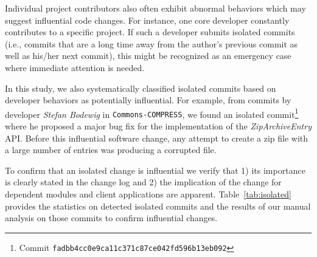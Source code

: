 
Individual project contributors also often exhibit abnormal
behaviors which may suggest influential code changes.
For instance, one core developer constantly contributes
 to a specific project. If such a developer
submits isolated commits (i.e., commits that are a long time away from
the author's previous commit as well as his/her next commit), this
might be recognized as an emergency case where immediate attention is needed. 

In this study, we also systematically classified isolated commits based on
developer behaviors as potentially influential. For example, from commits by
developer {\em Stefan Bodewig} in {\tt Commons-COMPRESS}, we found an isolated
commit\footnote{Commit \tt\small fadbb4cc0e9ca11c371c87ce042fd596b13eb092}
where he proposed a major bug fix for the implementation of the {\em
ZipArchiveEntry} API. Before this influential software change, any attempt to create a
zip file with a large number of entries was producing a corrupted file.





To confirm that an isolated change is influential we verify that 1) its importance is clearly stated in the change log and
2) the implication of the change for dependent modules and client applications are apparent.
Table~\ref{tab:isolated} provides the statistics on detected isolated commits
and the results of our manual analysis on those  commits to confirm influential changes.


